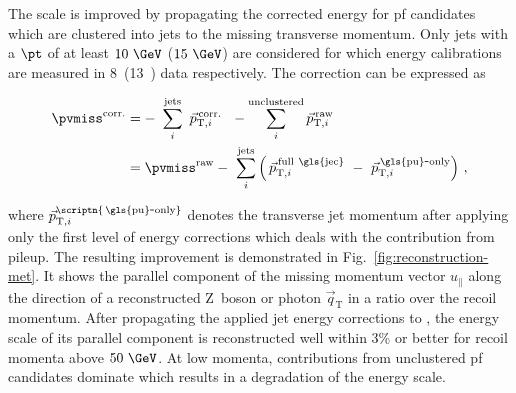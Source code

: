The \met scale is improved by propagating the corrected energy for \gls{pf} candidates which are clustered into jets to the missing transverse momentum. Only jets with a $\pt$ of at least $10~\GeV$ ($15~\GeV$) are considered for which energy calibrations are measured in 8~\TeV (13~\TeV) data respectively. The correction can be expressed as

\begin{subequations}
\begin{align}
\pvmiss^\mathrm{corr.}&=-~\sum_{i}^\mathrm{jets}~\vec{p}_{\mathrm{T},i}^\mathrm{\,corr.}~~-\sum_{i}^\mathrm{unclustered}\vec{p}_{\mathrm{T},i}^\mathrm{\,raw}\\
&=\pvmiss^\mathrm{raw}-~\sum_{i}^\mathrm{jets}\left(\, \vec{p}_{\mathrm{T},i}^\mathrm{\,full~\gls{jec}}~-~\vec{p}_{\mathrm{T},i}^\mathrm{\,\gls{pu}\mbox{-}only}\right)\,,
\end{align}
\end{subequations}

where $\vec{p}_{\mathrm{T},i}^\scriptn{\mathrm{\,\gls{pu}\mbox{-}only}}$ denotes the transverse jet momentum after applying only the first level of energy corrections which deals with the contribution from pileup. The resulting improvement is demonstrated in Fig.~\ref{fig:reconstruction-met}. It shows the parallel component of the missing momentum vector $u_{\parallel}$ along the direction of a reconstructed $\mathrm{Z}$~boson or photon $\vec{q}_\mathrm{T}$ in a ratio over the recoil momentum. After propagating the applied jet energy corrections to \pvmiss, the energy scale of its parallel component is reconstructed well within 3\% or better for recoil momenta above $50~\GeV$. At low momenta, contributions from unclustered \gls{pf} candidates dominate which results in a degradation of the energy scale.


